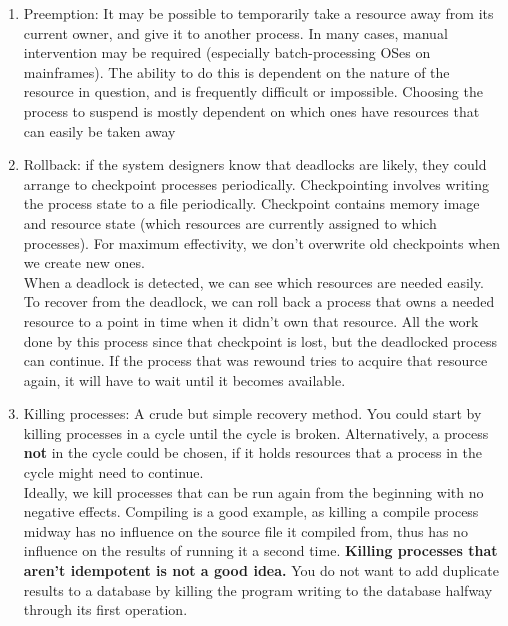 \documentclass{article}
\begin{document}
\begin{enumerate}
	\item Preemption: It may be possible to temporarily take a resource away from its current owner, and give it to another process. In many cases, manual intervention may be required (especially batch-processing OSes on mainframes). The ability to do this is dependent on the nature of the resource in question, and is frequently difficult or impossible. Choosing the process to suspend is mostly dependent on which ones have resources that can easily be taken away
	\item Rollback: if the system designers know that deadlocks are likely, they could arrange to checkpoint processes periodically. Checkpointing involves writing the process state to a file periodically. Checkpoint contains memory image and resource state (which resources are currently assigned to which processes). For maximum effectivity, we don't overwrite old checkpoints when we create new ones. 
	\\When a deadlock is detected, we can see which resources are needed easily. To recover from the deadlock, we can roll back a process that owns a needed resource to a point in time when it didn't own that resource. All the work done by this process since that checkpoint is lost, but the deadlocked process can continue. If the process that was rewound tries to acquire that resource again, it will have to wait until it becomes available.
	\item Killing processes: A crude but simple recovery method. You could start by killing processes in a cycle until the cycle is broken. Alternatively, a process \textbf{not} in the cycle could be chosen, if it holds resources that a process in the cycle might need to continue. 
	\\Ideally, we kill processes that can be run again from the beginning with no negative effects. Compiling is a good example, as killing a compile process midway has no influence on the source file it compiled from, thus has no influence on the results of running it a second time. \textbf{Killing processes that aren't idempotent is not a good idea.} You do not want to add duplicate results to a database by killing the program writing to the database halfway through its first operation.
\end{enumerate}
\end{document}

